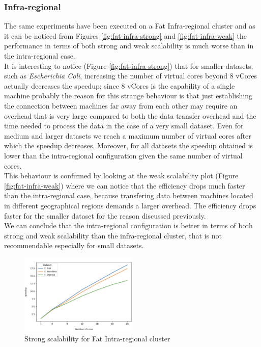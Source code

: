 \documentclass[final,5p,times,twocolumn,authoryear]{elsarticle}
\begin{document}
\subsubsection{Infra-regional}
The same experiments have been executed on a Fat Infra-regional cluster and as it can be noticed from Figures \ref{fig:fat-infra-strong} and \ref{fig:fat-infra-weak} the performance in terms of both strong and weak scalability is much worse than in the intra-regional case. \\
It is interesting to notice (Figure \ref{fig:fat-infra-strong}) that for smaller datasets, such as \emph{Escherichia Coli}, increasing the number of virtual cores beyond 8 vCores actually decreases the speedup; since 8 vCores is the capability of a single machine probably the reason for this strange behaviour is that just establishing the connection between machines far away from each other may require an overhead that is very large compared to both the data transfer overhead and the time needed to process the data in the case of a very small dataset. Even for medium and larger datasets we reach a maximum number of virtual cores after which the speedup decreases. Moreover, for all datasets the speedup obtained is lower than the intra-regional configuration given the same number of virtual cores. \\ 
This behaviour is confirmed by looking at the weak scalability plot (Figure \ref{fig:fat-infra-weak}) where we can notice that the efficiency drops much faster than the intra-regional case, because transfering data between machines located in different geographical regions demands a larger overhead. The efficiency drops faster for the smaller dataset for the reason discussed previously. \\
We can conclude that the intra-regional configuration is better in terms of both strong and weak scalability than the infra-regional cluster, that is not recommendable especially for small datasets.
\begin{figure}
    \centering
    \includegraphics[width=0.5\textwidth]{images/fat_intra_strong.png}
    \caption{Strong scalability for Fat Intra-regional cluster }
    \label{fig:fat-intra-strong}
\end{figure}
\end{document}
